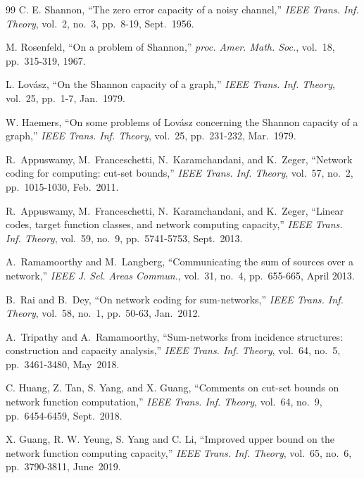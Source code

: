 \documentclass[11pt,draftclsnofoot,onecolumn]{IEEEtran}
\begin{document}
\begin{thebibliography}{99}
C. E. Shannon, ``The zero error capacity of a noisy channel,'' \textit{IEEE Trans. Inf. Theory}, vol.~2, no.~3, pp.~8-19, Sept.~1956.

M. Rosenfeld, ``On a problem of Shannon,'' \textit{proc. Amer. Math. Soc.}, vol.~18, pp.~315-319, 1967.

L. Lov\'{a}sz, ``On the Shannon capacity of a graph,'' \textit{IEEE Trans. Inf. Theory}, vol.~25, pp.~1-7, Jan.~1979.

W. Haemers, ``On some problems of Lov{\'a}sz concerning the Shannon capacity of a graph,''
 \textit{IEEE Trans. Inf. Theory}, vol.~25, pp.~231-232, Mar.~1979.

R.~Appuswamy, M.~Franceschetti, N.~Karamchandani, and K.~Zeger, ``Network coding for computing: cut-set bounds,''
 \textit{IEEE Trans. Inf. Theory}, vol.~57, no.~2, pp.~1015-1030, Feb.~2011.

R.~Appuswamy, M.~Franceschetti, N.~Karamchandani, and K.~Zeger, ``Linear codes, target function classes, and network computing capacity,''
\textit{IEEE Trans. Inf. Theory}, vol.~59, no.~9, pp.~5741-5753, Sept.~2013.


A.~Ramamoorthy and M.~Langberg, ``Communicating the sum of sources over a network,''
\textit{IEEE J. Sel. Areas Commun.}, vol.~31, no.~4, pp.~655-665, April 2013.


B.~Rai and B.~Dey, ``On network coding for sum-networks,''
 \textit{IEEE Trans. Inf. Theory}, vol.~58, no.~1, pp.~50-63, Jan.~2012.


A.~Tripathy and A.~Ramamoorthy, ``Sum-networks from incidence structures: construction and capacity analysis,''
\textit{IEEE Trans. Inf. Theory}, vol.~64, no.~5, pp.~3461-3480, May~2018.


 C. Huang, Z. Tan, S. Yang, and X. Guang, ``Comments on cut-set bounds on network function computation,''
 \textit{IEEE Trans. Inf. Theory}, vol.~64, no.~9, pp.~6454-6459, Sept.~2018.


X. Guang, R. W. Yeung, S. Yang and C. Li, ``Improved upper bound on the network function computing capacity,''
\textit{IEEE Trans. Inf. Theory}, vol.~65, no.~6, pp.~3790-3811, June~2019.



\end{thebibliography}
\end{document}
